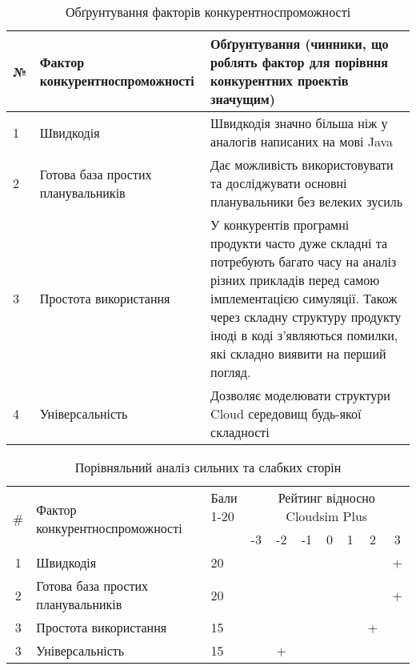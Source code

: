 \begin{table}[H]
	\begin{tabular}
		{|l|p{7cm}|p{7cm}|} \hline
		№
		& Фактор конкурентноспроможності
		& Обґрунтування (чинники, що роблять фактор для порівння конкурентних проектів значущим)
		\\ \hline
		
		1
		& Швидкодія
		& Швидкодія значно більша ніж у аналогів написаних на мові Java
		\\ \hline
		
		2
		& Готова база простих планувальників
		& Дає можливість використовувати та досліджувати основні планувальники без велеких зусиль
		\\ \hline
		
		3
		& Простота використання
		& У конкурентів програмні продукти часто дуже складні та потребують багато часу на аналіз різних прикладів перед самою імплементацією симуляції. Також через складну структуру продукту іноді в коді з'являються помилки, які складно виявити на перший погляд.
		\\ \hline
		
		4
		& Універсальність
		& Дозволяє моделювати структури Cloud середовищ будь-якої складності
		
		\\ \hline
	\end{tabular}
	\caption{Обґрунтування факторів конкурентноспроможності}
\end{table}


\begin{table}[H]
	\centering
	\begin{tabular}{|c|p{8cm}|p{1cm}|c|c|c|c|c|c|c|}
		\hline
		\multirow{2}{*}{\#} & \multirow{2}{*}{Фактор конкурентноспроможності}                 & \multirowcell{2}{Бали\\ 1-20} & \multicolumn{7}{c|}{Рейтинг відносно Cloudsim Plus} \\ \cline{4-10}
		
							&                                              					  &                            &  -3 & -2  & -1  & 0 & 1 & 2 & 3 \\ \hline
		1                   & Швидкодія								            			  & 20                         &     &     &     &   &   &   & + \\ \hline
		2                   & Готова база простих планувальників                              & 20                         &     &     &     &   &   &   & + \\ \hline
		3                   & Простота використання           								  & 15                         &     &     &     &   &   & + &   \\ \hline
		3                   & Універсальність										          & 15                         &     &  +  &     &   &   &   &   \\ \hline
	\end{tabular}
	\caption{Порівняльний аналіз сильних та слабких сторін}
\end{table}

